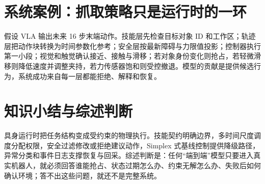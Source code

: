 \section{系统案例：抓取策略只是运行时的一环}

假设 VLA 输出未来 16 步末端动作。技能层先检查目标对象 ID 和工作区；轨迹层把动作块转换为时间参数化参考；安全层按最新障碍与力限值投影；控制器执行第一小段；视觉和触觉确认接近、接触与滑移；若对象身份变化则抢占，若轻微滑移则降低速度并调整夹持，若力传感器饱和则受控撤退。模型的贡献是提供候选行为，系统成功来自每一层都能拒绝、解释和恢复。

\section{知识小结与综述判断}

具身运行时把任务结构变成受约束的物理执行。技能契约明确边界，多时间尺度调度分配权限，安全过滤修改或拒绝建议动作，Simplex 式基线控制提供降级路径，异常分类和事件日志支撑恢复与回采。综述判断是：任何“端到端”模型只要进入真实机器人，就必须回答谁能抢占、状态过期怎么办、约束无解怎么办、失败后如何确认环境；答不出这些问题，就还不是完整系统。

